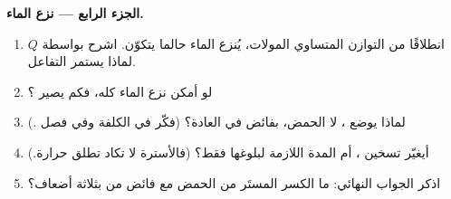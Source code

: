 \begin{problem}
\medskip
\noindent\textbf{الجزء الرابع --- نزع الماء.}
\begin{enumerate}[resume]
  \item انطلاقًا من التوازن المتساوي المولات، يُنزع الماء حالما
        يتكوّن. اشرح بواسطة $Q$ لماذا يستمر التفاعل.
  \item لو أمكن نزع الماء كله، فكم يصير ؟
  \item لماذا يوضع ، لا الحمض، بفائض في العادة؟ (فكّر
        في الكلفة وفي فصل .)
  \item أيغيّر تسخين  ، أم المدة اللازمة
        لبلوغها فقط؟ (فالأسترة لا تكاد تطلق حرارة.)
  \item اذكر الجواب النهائي: ما الكسر المستَر من الحمض
        مع فائض من  بثلاثة أضعاف؟
\end{enumerate}
\end{problem}
